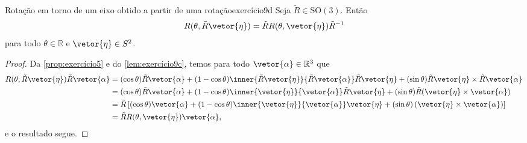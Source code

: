 \begin{lemma}{Rotação em torno de um eixo obtido a partir de uma rotação}{exercício9d}
    Seja \(\tilde{R} \in \mathrm{SO}(3)\). Então
    \begin{equation*}
        R(\theta, \tilde{R}\vetor{\eta}) = \tilde{R}R(\theta, \vetor{\eta})\tilde{R}^{-1}
    \end{equation*}
    para todo \(\theta \in \mathbb{R}\) e \(\vetor{\eta} \in S^2\).
\end{lemma}
\begin{proof}
    Da \cref{prop:exercício5} e do \cref{lem:exercício9c}, temos para todo \(\vetor{\alpha} \in \mathbb{R}^3\) que
    \begin{align*}
        R(\theta, \tilde{R}\vetor{\eta})\tilde{R} \vetor{\alpha} &= (\cos\theta) \tilde{R}\vetor{\alpha} + (1 - \cos\theta) \inner{\tilde{R} \vetor{\eta}}{\tilde{R}\vetor{\alpha}} \tilde{R}\vetor{\eta} + (\sin\theta)\tilde{R}\vetor{\eta}\times \tilde{R}\vetor{\alpha}\\
                                                 &= (\cos\theta) \tilde{R}\vetor{\alpha} + (1 - \cos\theta) \inner{\vetor{\eta}}{\vetor{\alpha}} \tilde{R}\vetor{\eta} + (\sin\theta)\tilde{R}(\vetor{\eta}\times \vetor{\alpha})\\
                                                 &= \tilde{R}\left[(\cos\theta) \vetor{\alpha} + (1 - \cos\theta) \inner{\vetor{\eta}}{\vetor{\alpha}}\vetor{\eta} + (\sin\theta)\left(\vetor{\eta}\times \vetor{\alpha}\right)\right]\\
                                                 &= \tilde{R} R(\theta, \vetor{\eta})\vetor{\alpha},
    \end{align*}
    e o resultado segue.
\end{proof}

